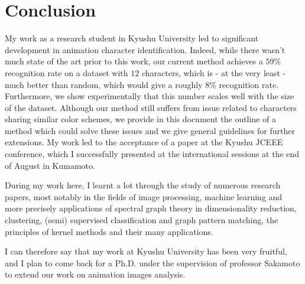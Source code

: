 \section*{Conclusion}

My work as a research student in Kyushu University led to significant development in animation character identification. Indeed, while there wasn't much state of the art prior to this work, our current method achieves a $59$\% recognition rate on a dataset with $12$ characters, which is - at the very least - much better than random, which would give a roughly $8$\% recognition rate. Furthermore, we show experimentally that this number scales well with the size of the dataset. Although our method still suffers from issue related to characters sharing similar color schemes, we provide in this document the outline of a method which could solve these issues and we give general guidelines for further extensions. My work led to the acceptance of a paper at the Kyushu JCEEE conference, which I successfully presented at the international sessions at the end of August in Kumamoto.

During my work here, I learnt a lot through the study of numerous research papers, most notably in the fields of image processing, machine learning and more precisely applications of spectral graph theory in dimensionality reduction, clustering, (semi) supervised classification and graph pattern matching, the principles of kernel methods and their many applications.

I can therefore say that my work at Kyushu University has been very fruitful, and I plan to come back for a Ph.D. under the supervision of professor Sakamoto to extend our work on animation images analysis.